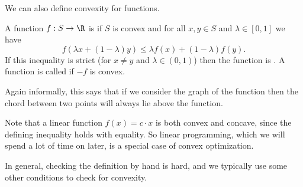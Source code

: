 We can also define convexity for functions.

\begin{definition}
    A function $f: S \rightarrow \R$ is  if $S$ is convex and for all $x, y \in S$ and $\lambda \in [0, 1]$ we have
    $$
    f(\lambda x + (1 - \lambda) y) \leq \lambda f(x) + (1 - \lambda) f(y).
    $$
    If this inequality is strict (for $x \neq y$ and $\lambda \in (0,1)$) then the function is . A function is called  if $-f$ is convex.
\end{definition}

Again informally, this says that if we consider the graph of the function then the chord between two points will always lie above the function.

\begin{center}
\end{center}

Note that a linear function $f(x) = c \cdot x$ is both convex and concave, since the defining inequality holds with equality. So linear programming, which we will spend a lot of time on later, is a special case of convex optimization.

In general, checking the definition by hand is hard, and we typically use some other conditions to check for convexity.


